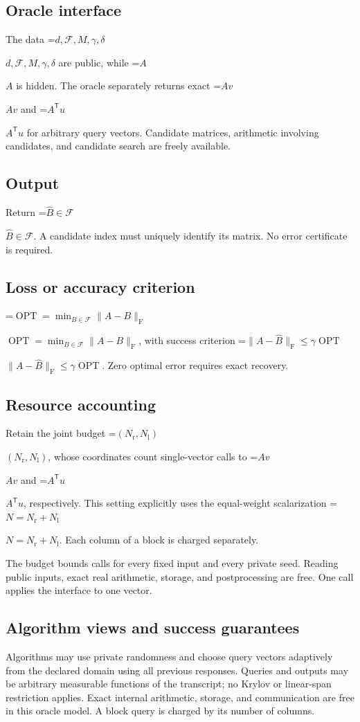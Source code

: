 \documentclass[10pt,a4paper]{article}
\newcommand{\AtlasMath}[1]{\par\begingroup\centering\setbox0=\hbox{$\displaystyle #1$}\ifdim\wd0>1.4\linewidth\typeout{ATLAS WIDE FORMULA: \the\wd0}\fi\ifdim\wd0>\linewidth\resizebox{\linewidth}{!}{\box0}\else\box0\fi\par\endgroup}
\newcommand{\AtlasInlineMath}[1]{\begingroup\setbox0=\hbox{$#1$}\ifdim\wd0>.4\linewidth\endgroup\AtlasMath{#1}\else\endgroup$#1$\fi}
\begin{document}
\subsection{Oracle interface}
The data \AtlasInlineMath{d,\mathcal{F},M,\gamma,\delta} are public, while \AtlasInlineMath{A} is hidden. The oracle separately returns exact \AtlasInlineMath{Av} and \AtlasInlineMath{A^{\mathsf T}u} for arbitrary query vectors. Candidate matrices, arithmetic involving candidates, and candidate search are freely available.

\subsection{Output}
Return \AtlasInlineMath{\widehat B\in\mathcal F}. A candidate index must uniquely identify its matrix. No error certificate is required.

\subsection{Loss or accuracy criterion}
\AtlasInlineMath{\operatorname{OPT}=\min_{B\in\mathcal{F}}\|A-B\|_{\mathrm{F}}}, with success criterion \AtlasInlineMath{\|A-\widehat{B}\|_{\mathrm{F}}\le\gamma\operatorname{OPT}}. Zero optimal error requires exact recovery.

\subsection{Resource accounting}
Retain the joint budget \AtlasInlineMath{(N_{\mathrm{r}},N_{\mathrm{l}})}, whose coordinates count single-vector calls to \AtlasInlineMath{Av} and \AtlasInlineMath{A^{\mathsf T}u}, respectively. This setting explicitly uses the equal-weight scalarization \AtlasInlineMath{N=N_{\mathrm{r}}+N_{\mathrm{l}}}. Each column of a block is charged separately.

The budget bounds calls for every fixed input and every private seed. Reading public inputs, exact real arithmetic, storage, and postprocessing are free. One call applies the interface to one vector.

\subsection{Algorithm views and success guarantees}
Algorithms may use private randomness and choose query vectors adaptively from the declared domain using all previous responses. Queries and outputs may be arbitrary measurable functions of the transcript; no Krylov or linear-span restriction applies. Exact internal arithmetic, storage, and communication are free in this oracle model. A block query is charged by its number of columns.
\end{document}
